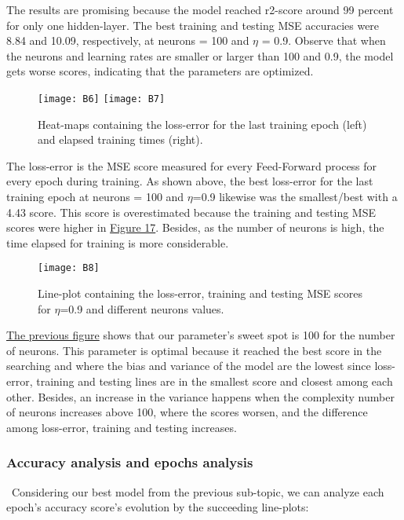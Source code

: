 The results are promising because the model reached r2-score around 99 percent for only one hidden-layer. The best training and testing MSE accuracies were 8.84 and 10.09, respectively, at neurons = 100 and $\eta$ = 0.9. Observe that when the neurons and learning rates are smaller or larger than 100 and 0.9, the model gets worse scores, indicating that the parameters are optimized.

\begin{figure}[H]
\label{fig:B4}
\centering
\texttt{[image: B6]}
\texttt{[image: B7]}
\caption{Heat-maps containing the loss-error for the last training epoch (left) and elapsed training times (right).}
\end{figure}

The loss-error is the MSE score measured for every Feed-Forward process for every epoch during training. As shown above, the best loss-error for the last training epoch at neurons = 100 and $\eta$=0.9 likewise was the smallest/best with a 4.43 score. This score is overestimated because the training and testing MSE scores were higher in \hyperref[fig:B3]{Figure 17}. Besides, as the number of neurons is high, the time elapsed for training is more considerable.

\begin{figure}[H]
\label{fig:B5}
\centering
\texttt{[image: B8]}
\caption{Line-plot containing the loss-error, training and testing MSE scores for $\eta$=0.9 and different neurons values.}
\end{figure}

\hyperref[fig:B5]{The previous figure} shows that our parameter's sweet spot is 100 for the number of neurons. This parameter is optimal because it reached the best score in the searching and where the bias and variance of the model are the lowest since loss-error, training and testing lines are in the smallest score and closest among each other. Besides, an increase in the variance happens when the complexity number of neurons increases above 100, where the scores worsen, and the difference among loss-error, training and testing increases.

\subsubsection{Accuracy analysis and epochs analysis}
\label{chap:Accuracy analysis and epochs analysis}

\qquad \, Considering our best model from the previous sub-topic, we can analyze each epoch's accuracy score's evolution by the succeeding line-plots:

